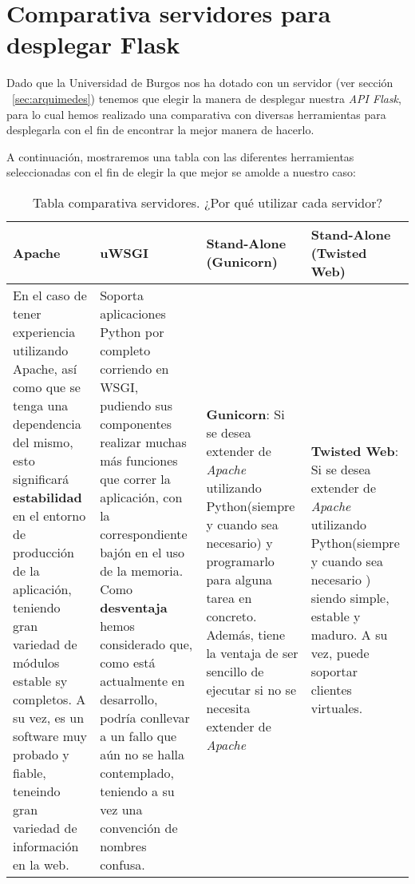 \section{Comparativa servidores para desplegar Flask}\label{sec:comparativa-servidores}
Dado que la Universidad de Burgos nos ha dotado con un servidor (ver sección ~\ref{sec:arquimedes}) tenemos que elegir la manera de desplegar nuestra \textit{API Flask}, para lo cual hemos realizado una comparativa con diversas herramientas para desplegarla con el fin de encontrar la mejor manera de hacerlo.

A continuación, mostraremos una tabla con las diferentes herramientas seleccionadas con el fin de elegir la que mejor se amolde a nuestro caso:

\begin{landscape}
	\begin{table}
		\centering
		\caption{Tabla comparativa servidores. ¿Por qué utilizar cada servidor?}
		\label{serverTable}
		\begin{tabular}{p{3.5cm} p{3.5cm} p{3.5cm} p{3.5cm}}
			\toprule
			\textbf{Apache} & \textbf{uWSGI} & \textbf{Stand-Alone (Gunicorn)} & \textbf{Stand-Alone (Twisted Web)} \\
			\midrule
			En el caso de tener experiencia utilizando Apache, así como que se tenga una dependencia del mismo, esto significará \textbf{estabilidad} en el entorno de producción de la aplicación, teniendo gran variedad de módulos estable sy completos. A su vez, es un software muy probado y fiable, teneindo gran variedad de información en la web. & Soporta aplicaciones Python por completo corriendo en WSGI, pudiendo sus componentes realizar muchas más funciones que correr la aplicación, con la correspondiente bajón en el uso de la memoria. Como \textbf{desventaja} hemos considerado que, como está actualmente en desarrollo, podría conllevar a un fallo que aún no se halla contemplado, teniendo a su vez una convención de nombres confusa. & \textbf{Gunicorn}: Si se desea extender de \textit{Apache} utilizando Python(siempre y cuando sea necesario) y programarlo para alguna tarea en concreto. Además, tiene la ventaja de ser sencillo de ejecutar si no se necesita extender de \textit{Apache} & \textbf{Twisted Web}: Si se desea extender de \textit{Apache} utilizando Python(siempre y cuando sea necesario ) siendo simple, estable y maduro. A su vez, puede soportar clientes virtuales.\\
			\bottomrule
		\end{tabular}
	\end{table}
\end{landscape}

